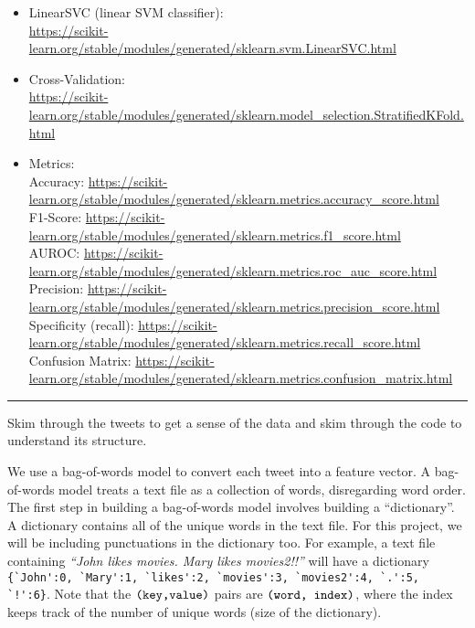 \documentclass[11pt]{article}
\begin{document}
\begin{itemize}[nolistsep]
\item LinearSVC (linear SVM classifier): \\{\footnotesize \url{https://scikit-learn.org/stable/modules/generated/sklearn.svm.LinearSVC.html}}
\item Cross-Validation: \\{\footnotesize \url{https://scikit-learn.org/stable/modules/generated/sklearn.model_selection.StratifiedKFold.html}}
\item Metrics: 
\\ Accuracy: {\footnotesize \url{https://scikit-learn.org/stable/modules/generated/sklearn.metrics.accuracy_score.html}}
\\ F1-Score: {\footnotesize \url{https://scikit-learn.org/stable/modules/generated/sklearn.metrics.f1_score.html}}
\\ AUROC: {\footnotesize \url{https://scikit-learn.org/stable/modules/generated/sklearn.metrics.roc_auc_score.html}}
\\ Precision: {\footnotesize \url{https://scikit-learn.org/stable/modules/generated/sklearn.metrics.precision_score.html}}
\\ Specificity (recall): {\footnotesize \url{https://scikit-learn.org/stable/modules/generated/sklearn.metrics.recall_score.html}}
\\ Confusion Matrix: {\footnotesize \url{https://scikit-learn.org/stable/modules/generated/sklearn.metrics.confusion_matrix.html}}
\end{itemize}
\vspace{-\baselineskip}
\rule{\textwidth}{1pt}

Skim through the tweets to get a sense of the data and skim through the code to understand its structure.

We use a bag-of-words model to convert each tweet into a feature vector. A bag-of-words model treats a text file as a collection of words, disregarding word order. The first step in building a bag-of-words model involves building a ``dictionary''. A dictionary contains all of the unique words in the text file. For this project, we will be including punctuations in the dictionary too. For example, a text file containing \textit{``John likes movies. Mary likes movies2!!''} will have a dictionary \verb|{`John':0, `Mary':1, `likes':2, `movies':3, `movies2':4, `.':5, `!':6}|. Note that the $\verb|(key,value)|$ pairs are $\verb|(word, index)|$, where the index keeps track of the number of unique words (size of the dictionary).
\end{document}
